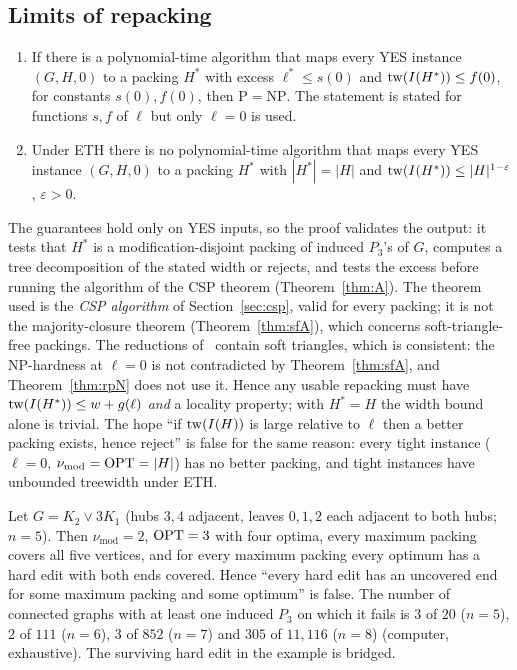 \subsection{Limits of repacking}
\begin{theorem}\label{thm:rpN}
\begin{enumerate}
\item[(a)] If there is a polynomial-time algorithm that maps every YES instance $(G,H,0)$ to a packing $H^*$ with excess $\ell^*\le s(0)$ and $\mathrm{tw}(I(H^*))\le f(0)$, for constants $s(0),f(0)$, then $\mathrm P=\mathrm{NP}$. The statement is stated for functions $s,f$ of $\ell$ but only $\ell=0$ is used.
\item[(b)] Under ETH there is no polynomial-time algorithm that maps every YES instance $(G,H,0)$ to a packing $H^*$ with $|H^*|=|H|$ and $\mathrm{tw}(I(H^*))\le|H|^{1-\varepsilon}$, $\varepsilon>0$.
\end{enumerate}
\end{theorem}
The guarantees hold only on YES inputs, so the proof validates the output: it tests that $H^*$ is a modification-disjoint packing of induced $P_3$'s of $G$, computes a tree decomposition of the stated width or rejects, and tests the excess before running the algorithm of the CSP theorem (Theorem~\ref{thm:A}). The theorem used is the \emph{CSP algorithm} of Section~\ref{sec:csp}, valid for every packing; it is not the majority-closure theorem (Theorem~\ref{thm:sfA}), which concerns soft-triangle-free packings. The reductions of~\cite{LPS23} contain soft triangles, which is consistent: the NP-hardness at $\ell=0$ is not contradicted by Theorem~\ref{thm:sfA}, and Theorem~\ref{thm:rpN} does not use it. Hence any usable repacking must have $\mathrm{tw}(I(H^*))\le w+g(\ell)$ \emph{and} a locality property; with $H^*=H$ the width bound alone is trivial. The hope ``if $\mathrm{tw}(I(H))$ is large relative to $\ell$ then a better packing exists, hence reject'' is false for the same reason: every tight instance ($\ell=0$, $\nu_{\mathrm{mod}}=\mathrm{OPT}=|H|$) has no better packing, and tight instances have unbounded treewidth under ETH.

\begin{proposition}\label{prop:rpnf}
Let $G=K_2\vee3K_1$ (hubs $3,4$ adjacent, leaves $0,1,2$ each adjacent to both hubs; $n=5$). Then $\nu_{\mathrm{mod}}=2$, $\mathrm{OPT}=3$ with four optima, every maximum packing covers all five vertices, and for every maximum packing every optimum has a hard edit with both ends covered. Hence ``every hard edit has an uncovered end for some maximum packing and some optimum'' is false. The number of connected graphs with at least one induced $P_3$ on which it fails is $3$ of $20$ ($n=5$), $2$ of $111$ ($n=6$), $3$ of $852$ ($n=7$) and $305$ of $11{,}116$ ($n=8$) (computer, exhaustive). The surviving hard edit in the example is bridged.
\end{proposition}

